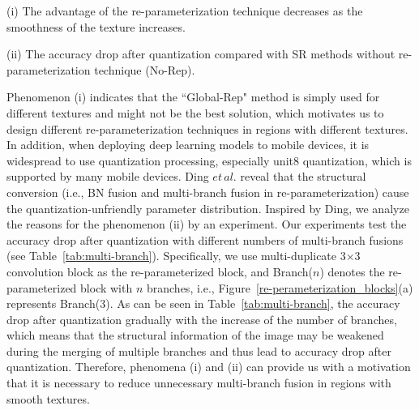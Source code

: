 \documentclass[sn-mathphys]{sn-jnl}%
\theoremstyle{thmstyleone}%
\theoremstyle{thmstyletwo}%
\theoremstyle{thmstylethree}%
\begin{document}
(i) The advantage of the re-parameterization technique decreases as the smoothness of the texture increases.

(ii) The accuracy drop after quantization compared with SR methods without re-parameterization technique (No-Rep). 

\begin{table}
\centering
\caption{The accuracy drop after quantization with different numbers of multi-branch fusions.}
\label{tab:multi-branch}
\end{table}

Phenomenon (i) indicates that the ``Global-Rep" method is simply used for different textures and might not be the best solution, which motivates us to design different re-parameterization techniques in regions with different textures. In addition, when deploying deep learning models to mobile devices, it is widespread to use quantization processing, especially unit8 quantization, which is supported by many mobile devices. Ding $et\,al.$ \cite{RepOpt} reveal that the structural conversion (i.e., BN fusion and multi-branch fusion in re-parameterization) cause the quantization-unfriendly parameter distribution. Inspired by Ding, we analyze the reasons for the phenomenon (ii) by an experiment. Our experiments test the accuracy drop after quantization with different numbers of multi-branch fusions (see Table~\ref{tab:multi-branch}). Specifically, we use multi-duplicate 3$\times$3 convolution block as the re-parameterized block, and Branch($n$) denotes the re-parameterized block with $n$ branches, i.e., Figure~\ref{re-perameterization_blocks}(a) represents Branch($3$). As can be seen in Table~\ref{tab:multi-branch}, the accuracy drop after quantization gradually with the increase of the number of branches, which means that the structural information of the image may be weakened during the merging of multiple branches and thus lead to accuracy drop after quantization. Therefore, phenomena (i) and (ii) can provide us with a motivation that it is necessary to reduce unnecessary multi-branch fusion in regions with smooth textures.
\end{document}
